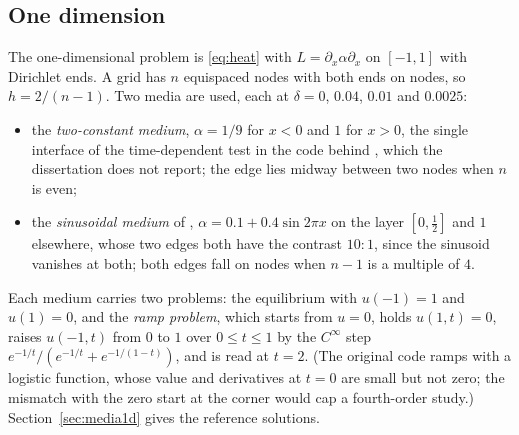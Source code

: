 \documentclass[11pt]{amsart}
\theoremstyle{definition}
\theoremstyle{remark}
\newcommand{\px}{\partial_x}
\begin{document}
\subsection{One dimension}
\label{sec:setting1d}
The one-dimensional problem is \eqref{eq:heat} with $L = \px \alpha \px$ on
$[-1, 1]$ with Dirichlet ends. A grid has $n$ equispaced nodes with both
ends on nodes, so $h = 2 / (n - 1)$. Two media are used, each at
$\delta = 0$, $0.04$, $0.01$ and $0.0025$:
\begin{itemize}
\item the \emph{two-constant medium}, $\alpha = 1/9$ for $x < 0$ and $1$ for
  $x > 0$, the single interface of the time-dependent test in the code
  behind \cite{Martin2016}, which the dissertation does not report; the
  edge lies midway between two nodes when $n$ is even;
\item the \emph{sinusoidal medium} of \cite[eq.~(75)]{Martin2016},
  $\alpha = 0.1 + 0.4 \sin 2\pi x$ on the layer $[0, \tfrac12]$ and $1$
  elsewhere, whose two edges both have the contrast $10 : 1$, since the
  sinusoid vanishes at both; both edges fall on nodes when $n - 1$ is a
  multiple of $4$.
\end{itemize}
Each medium carries two problems: the equilibrium with $u(-1) = 1$ and
$u(1) = 0$, and the \emph{ramp problem}, which starts from $u = 0$, holds
$u(1, t) = 0$, raises $u(-1, t)$ from $0$ to $1$ over $0 \le t \le 1$ by
the $C^\infty$ step
$e^{-1/t} / (e^{-1/t} + e^{-1/(1-t)})$, and is read at $t = 2$. (The
original code ramps with a logistic function, whose value and derivatives at
$t = 0$ are small but not zero; the mismatch with the zero start at the
corner would cap a fourth-order study.) Section~\ref{sec:media1d} gives the
reference solutions.
\end{document}
